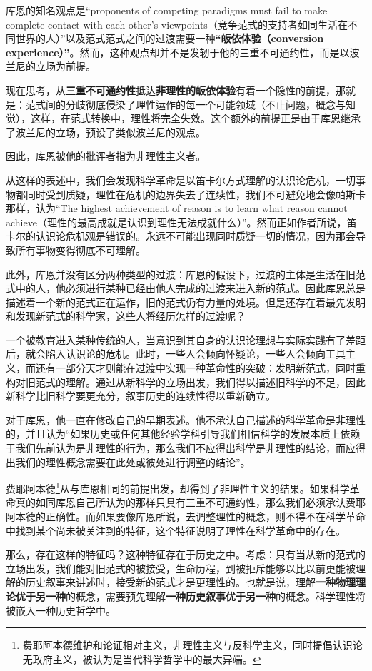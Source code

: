 \documentclass[12pt, a4paper, oneside]{ctexart}
\renewcommand{\b}{\textbf}
\newcommand{\f}{\footnote}
\begin{document}
库恩的知名观点是“proponents of competing paradigms must fail to make complete contact with each other's viewpoints（竞争范式的支持者如同生活在不同世界的人）”以及范式范式之间的过渡需要一种\b{“皈依体验（conversion experience）”}。然而，这种观点却并不是发轫于他的三重不可通约性，而是以波兰尼的立场为前提。

现在思考，从\b{三重不可通约性}抵达\b{非理性的皈依体验}有着一个隐性的前提，那就是：范式间的分歧彻底侵染了理性运作的每一个可能领域（不止问题，概念与知觉），这样，在范式转换中，理性将完全失效。这个额外的前提正是由于库恩继承了波兰尼的立场，预设了类似波兰尼的观点。

因此，库恩被他的批评者指为非理性主义者。

从这样的表述中，我们会发现科学革命是以笛卡尔方式理解的认识论危机，一切事物都同时受到质疑，理性在危机的边界失去了连续性，我们不可避免地会像帕斯卡那样，认为“The highest achievement of reason is to learn what reason cannot achieve（理性的最高成就是认识到理性无法成就什么）”。然而正如作者所说，笛卡尔的认识论危机观是错误的。永远不可能出现同时质疑一切的情况，因为那会导致所有事物变得彻底不可理解。

此外，库恩并没有区分两种类型的过渡：库恩的假设下，过渡的主体是生活在旧范式中的人，他必须进行某种已经由他人完成的过渡来进入新的范式。因此库恩总是描述着一个新的范式正在运作，旧的范式仍有力量的处境。但是还存在着最先发明和发现新范式的科学家，这些人将经历怎样的过渡呢？

一个被教育进入某种传统的人，当意识到其自身的认识论理想与实际实践有了差距后，就会陷入认识论的危机。此时，一些人会倾向怀疑论，一些人会倾向工具主义，而还有一部分天才则能在过渡中实现一种革命性的突破：发明新范式，同时重构对旧范式的理解。通过从新科学的立场出发，我们得以描述旧科学的不足，因此新科学比旧科学要更充分，叙事历史的连续性得以重新确立。

对于库恩，他一直在修改自己的早期表述。他不承认自己描述的科学革命是非理性的，并且认为“如果历史或任何其他经验学科引导我们相信科学的发展本质上依赖于我们先前认为是非理性的行为，那么我们不应得出科学是非理性的结论，而应得出我们的理性概念需要在此处或彼处进行调整的结论”。

费耶阿本德\f{费耶阿本德维护和论证相对主义，非理性主义与反科学主义，同时提倡认识论无政府主义，被认为是当代科学哲学中的最大异端。}从与库恩相同的前提出发，却得到了非理性主义的结果。如果科学革命真的如同库恩自己所认为的那样只具有三重不可通约性，那么我们必须承认费耶阿本德的正确性。而如果要像库恩所说，去调整理性的概念，则不得不在科学革命中找到某个尚未被关注到的特征，这个特征说明了理性在科学革命中的存在。

那么，存在这样的特征吗？这种特征存在于历史之中。考虑：只有当从新的范式的立场出发，我们能对旧范式的被接受，生命历程，到被拒斥能够以比以前更能被理解的历史叙事来讲述时，接受新的范式才是更理性的。也就是说，理解\b{一种物理理论优于另一种}的概念，需要预先理解\b{一种历史叙事优于另一种}的概念。科学理性将被嵌入一种历史哲学中。
\end{document}
